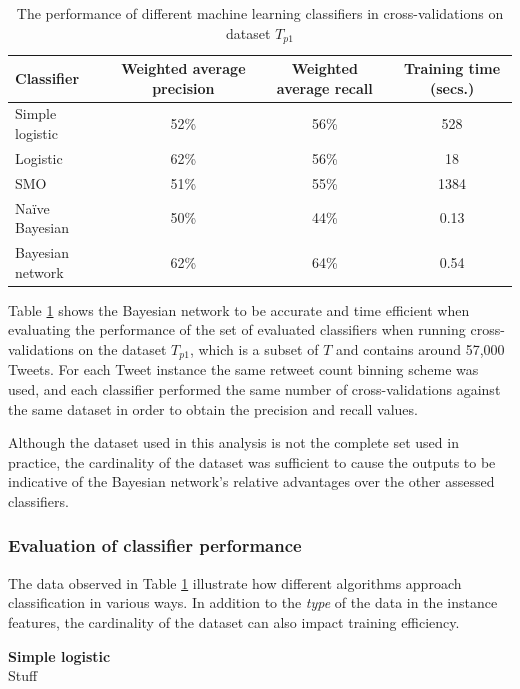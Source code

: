 \begin{table}[h]\footnotesize
\begin{center}
\begin{tabular}{ l | c | c | c }
	Classifier	& Weighted average precision & Weighted average recall &  Training time (secs.) \\
	\hline
	\hline 
	Simple logistic & 52\% &  56\% & 528\\
    Logistic        & 62\% &  56\% & 18\\
    SMO             & 51\% &  55\% & 1384\\
    Na\"{i}ve Bayesian & 50\% & 44\% & 0.13\\
    Bayesian network & 62\%&  64\% & 0.54\\
    \hline  
\end{tabular}
\end{center}
\caption{The performance of different machine learning classifiers in cross-validations on dataset $T_{p1}$}
\label{table:classifierperformance}
\end{table}

Table \ref{table:classifierperformance} shows the Bayesian network to be accurate and time efficient when evaluating the performance of the set of evaluated classifiers when running cross-validations on the dataset $T_{p1}$, which is a subset of $T$ and contains around 57,000 Tweets.  For each Tweet instance the same retweet count binning scheme was used, and each classifier performed the same number of cross-validations against the same dataset in order to obtain the precision and recall values.

Although the dataset used in this analysis is not the complete set used in practice, the cardinality of the dataset was sufficient to cause the outputs to be indicative of the Bayesian network's relative advantages over the other assessed classifiers.


\subsubsection{Evaluation of classifier performance}
The data observed in Table \ref{table:classifierperformance} illustrate how different algorithms approach classification in various ways. In addition to the \textit{type} of the data in the instance features, the cardinality of the dataset can also impact training efficiency.

\textbf{Simple logistic}\\
Stuff

